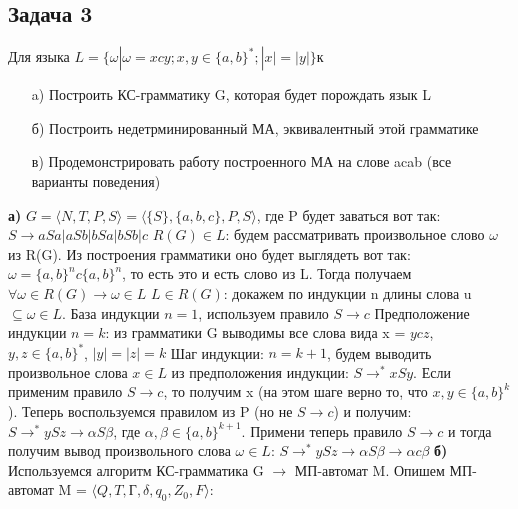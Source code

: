 \documentclass[a4paper,14pt]{article} %
\begin{document}
\subsection{Задача 3}
Для языка $L = \{\omega | \omega = xcy; x, y \in \{a, b\}^*; |x| = |y|\}$к
\begin{itemize}
    \item[a)] Построить КС-грамматику G, которая будет порождать язык L
    \item[б)] Построить недетрминированный МА, эквивалентный этой грамматике
    \item[в)] Продемонстрировать работу построенного МА на слове acab (все варианты поведения) 
\end{itemize}
\textbf{а)} $G = \langle N, T, P, S\rangle = \langle \{S\}, \{a, b, c\}, P, S \rangle$, где P будет заваться вот так:
\newline
$S \longrightarrow aSa|aSb|bSa|bSb|c$
\newline
$R(G) \in L$: будем рассматривать произвольное слово $\omega$ из R(G). Из построения грамматики оно будет выглядеть вот так:
$\omega = \{a, b\}^nc\{a, b\}^n$, то есть это и есть слово из L. Тогда получаем $\forall \omega \in R(G) \longrightarrow \omega \in L$
\newline
$L \in R(G)$: докажем по индукции n длины слова u $\subseteq \omega \in L$.
\newline
База индукции $n = 1$, используем правило $S \longrightarrow c$
\newline
Предположение индукции $n = k$: из грамматики G выводимы все слова вида x = $ycz$, $y, z \in \{a, b\}^*$, $|y|=|z|=k$
\newline
Шаг индукции: $n = k + 1$, будем выводить произвольное слова $x \in L$ из предположения индукции: $S \rightarrow^* xSy$.
\newline
Если применим правило $S \longrightarrow c$, то получим x (на этом шаге верно то, что $x, y \in \{a, b\}^k$). 
Теперь воспользуемся правилом из P (но не $S \longrightarrow c$) и получим:
$S \longrightarrow^* ySz \longrightarrow \alpha S \beta$, где $\alpha, \beta \in \{a, b\}^{k+1}$. Примени теперь правило $S \longrightarrow c$ и тогда получим вывод произвольного слова $\omega \in L$:
$S \longrightarrow^* ySz \longrightarrow \alpha S \beta \longrightarrow \alpha c \beta$
\newline
\textbf{б)} Используемся алгоритм КС-грамматика G $\longrightarrow$ МП-автомат M.
\newline
Опишем МП-автомат M  = $\langle Q, T, \text{Г}, \delta, q_0, Z_0, F \rangle$:
\end{document}
